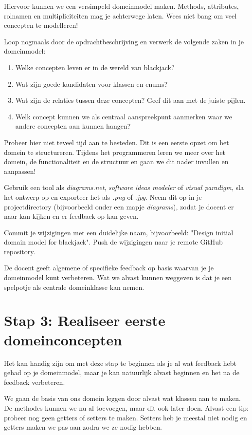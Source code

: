 Hiervoor kunnen we een versimpeld domeinmodel maken. 
Methods, attributes, rolnamen en multipliciteiten mag je achterwege laten.
Wees niet bang om veel concepten te modelleren!

Loop nogmaals door de opdrachtbeschrijving en verwerk de volgende zaken in je 
domeinmodel:
\begin{enumerate}
    \item Welke concepten leven er in de wereld van blackjack? 
    \item Wat zijn goede kandidaten voor klassen en enums?
    \item Wat zijn de relaties tussen deze concepten? Geef dit aan met de juiste pijlen.
    \item Welk concept kunnen we als centraal aanspreekpunt aanmerken waar we andere concepten aan kunnen hangen?
\end{enumerate}

Probeer hier niet teveel tijd aan te besteden.
Dit is een eerste opzet om het domein te structureren.
Tijdens het programmeren leren we meer over het domein, de functionaliteit en de structuur
en gaan we dit nader invullen en aanpassen!

Gebruik een tool als \textit{diagrams.net}, \textit{software ideas modeler} of \textit{visual paradigm},
sla het ontwerp op en exporteer het als \textit{.png} of \textit{.jpg}. 
Neem dit op in je projectdirectory (bijvoorbeeld onder een mapje \textit{diagrams}),
zodat je docent er naar kan kijken en er feedback op kan geven.

Commit je wijzigingen met een duidelijke naam, 
bijvoorbeeld: "Design initial domain model for blackjack". 
Push de wijzigingen naar je remote GitHub repository.

De docent geeft algemene of specifieke feedback
op basis waarvan je je domeinmodel kunt verbeteren.
Wat we alvast kunnen weggeven is dat je een spelpotje 
als centrale domeinklasse kan nemen.

\section{Stap 3: Realiseer eerste domeinconcepten}
Het kan handig zijn om met deze stap te beginnen als je al wat feedback hebt 
gehad op je domeinmodel, maar je kan natuurlijk alvast beginnen en het na 
de feedback verbeteren.


We gaan de basis van ons domein leggen door alvast wat klassen aan te maken.
De methodes kunnen we nu al toevoegen, maar dit ook later doen. Alvast een tip:
probeer nog geen getters of setters te maken. Setters heb je meestal niet nodig
en getters maken we pas aan zodra we ze nodig hebben.

